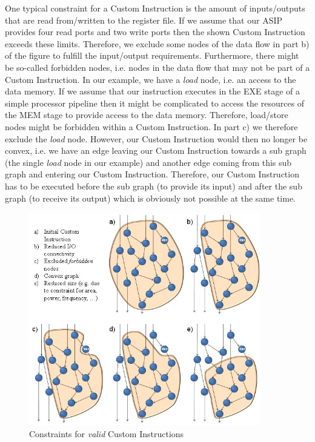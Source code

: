 One typical constraint for a Custom Instruction is the amount of
inputs/outputs that are read from/written to the register file. If we
assume that our ASIP provides four read ports and two write ports then
the shown Custom Instruction exceeds these limits. Therefore, we exclude
some nodes of the data flow in part b) of the figure to fulfill the
input/output requirements. Furthermore, there might be so-called
forbidden nodes, i.e. nodes in the data flow that may not be part of a
Custom Instruction. In our example, we have a \emph{load} node, i.e. an
access to the data memory. If we assume that our instruction executes in
the EXE stage of a simple processor pipeline then it might be
complicated to access the resources of the MEM stage to provide access
to the data memory. Therefore, load/store nodes might be forbidden
within a Custom Instruction. In part c) we therefore exclude the
\emph{load} node. However, our Custom Instruction would then no longer
be convex, i.e. we have an edge leaving our Custom Instruction towards a
sub graph (the single \emph{load} node in our example) and another edge
coming from this sub graph and entering our Custom Instruction.
Therefore, our Custom Instruction has to be executed {before} the sub
graph (to provide its input) and {after} the sub graph (to receive its
output) which is obviously not possible at the same time.
\begin{figure}[!htb]
	\centering
	\includegraphics[width=0.9\textwidth]{src/images/1-3.png}
	\caption{Constraints for \emph{valid} Custom Instructions}
	\label{fig:fig13}
\end{figure}
